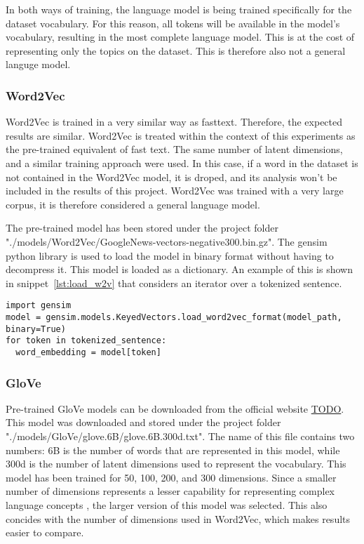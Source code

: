 In both ways of training, the language model is being trained specifically for the dataset vocabulary. For this reason, all tokens will be available in the model's vocabulary, resulting in the most complete language model. This is at the cost of representing only the topics on the dataset. This is therefore also not a general languge model.

\subsubsection{Word2Vec}\label{subs:Word2Vec}
Word2Vec is trained in a very similar way as fasttext. Therefore, the expected results are similar. Word2Vec is treated within the context of this experiments as the pre-trained equivalent of fast text. The same number of latent dimensions, and a similar training approach were used. In this case, if a word in the dataset is not contained in the Word2Vec model, it is droped, and its analysis won't be included in the results of this project. Word2Vec was trained with a very large corpus, it is therefore considered a general language model.

The pre-trained model has been stored under the project folder "./models/Word2Vec/GoogleNews-vectors-negative300.bin.gz". The gensim python library is used to load the model in binary format without having to decompress it. This model is loaded as a dictionary. An example of this is shown in snippet~\ref{lst:load_w2v} that considers an iterator over a tokenized sentence.

\begin{lstlisting}[caption={Loading Word2Vec},label=lst:load_w2v,frame=single]
import gensim
model = gensim.models.KeyedVectors.load_word2vec_format(model_path, binary=True)
for token in tokenized_sentence:
  word_embedding = model[token]
\end{lstlisting}

\subsubsection{GloVe}\label{subs:GloVe}
Pre-trained GloVe models can be downloaded from the official website \url{TODO}. This model was downloaded and stored under the project folder "./models/GloVe/glove.6B/glove.6B.300d.txt". The name of this file contains two numbers: 6B is the number of words that are represented in this model, while 300d is the number of latent dimensions used to represent the vocabulary. This model has been trained for 50, 100, 200, and 300 dimensions. Since a smaller number of dimensions represents a lesser capability for representing complex language concepts \cite{TODO}, the larger version of this model was selected. This also concides with the number of dimensions used in Word2Vec, which makes results easier to compare.

